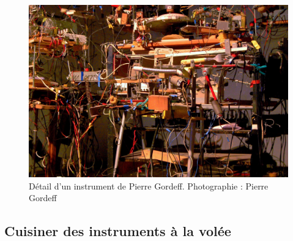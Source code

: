 \begin{figure}[!htbp]
	\captionsetup{format=plain}%
	\includegraphics[width=\textwidth]{gfx/02_ephemeral/PierreGordeff.jpg}
	\caption{Détail d'un instrument de Pierre Gordeff. Photographie : Pierre Gordeff}
	\label{fig:ephemeral:Gordeff}
\end{figure}

\subsection{Cuisiner des instruments à la volée}

